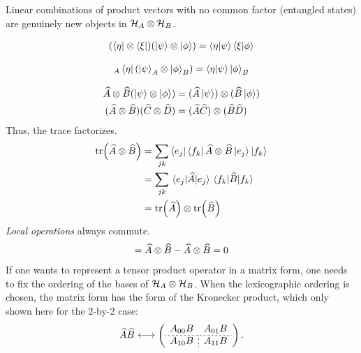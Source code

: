Linear combinations of product vectors with no common factor (entangled states) are genuinely new objects in $\mathcal{H}_A \otimes \mathcal{H}_B$.

\vspace{0.5em}
\begin{align}
	(\bra{\eta}\otimes\bra{\xi}) (\ket{\psi}\otimes\ket{\phi}) 
	= \left\langle \eta|\psi \right\rangle\left\langle \xi|\phi \right\rangle
\end{align}

\vspace{0.5em}
\begin{align}
	{}_A\bra{\eta} (\ket{\psi}_A\otimes\ket{\phi}_B) 
	= \left\langle \eta|\psi \right\rangle\ket{\phi}_B
\end{align}

\vspace{0.5em}
\begin{align}
	\widehat{A}\otimes \widehat{B} (\ket{\psi}\otimes\ket{\phi}) &= 
		(\widehat{A}\ket{\psi}) \otimes (\widehat{B}\ket{\phi}) \\
	(\widehat{A} \otimes \widehat{B})(\widehat{C}\otimes \widehat{D}) &= (\widehat{A} \widehat{C})\otimes (\widehat{B} \widehat{D})
\end{align}
Thus, the trace factorizes.
\begin{align}
	\tr(\widehat{A}\otimes \widehat{B}) &= \sum_{jk} \bra{e_j} \bra{f_k} \widehat{A}\otimes \widehat{B} \ket{e_j}\ket{f_k} \\
	&= \sum_{jk} \mel{e_j}{\widehat{A}}{e_j} \mel{f_k}{\widehat{B}}{f_k} \\
	&= \tr(\widehat{A}) \otimes \tr(\widehat{B})
\end{align}
\emph{Local operations} always commute.
\begin{align}
	[\op A\otimes \op\id, \op\id\otimes \op B] = \op A \otimes \op B - \op A \otimes \op B = 0
\end{align}
If one wants to represent a tensor product operator in a matrix form, one needs to fix the ordering of the bases of $\mathcal{H}_A \otimes \mathcal{H}_B$. When the lexicographic ordering is chosen, the matrix form has the form of the Kronecker product, which only shown here for the 2-by-2 case:
\begin{align}
	\op A \op B \longleftrightarrow \left(\begin{array}{c;{2pt/2pt}c}
		A_{00}B & A_{01}B \\ \hdashline[2pt/2pt]
		A_{10}B & A_{11}B 
	\end{array}\right).
\end{align}

